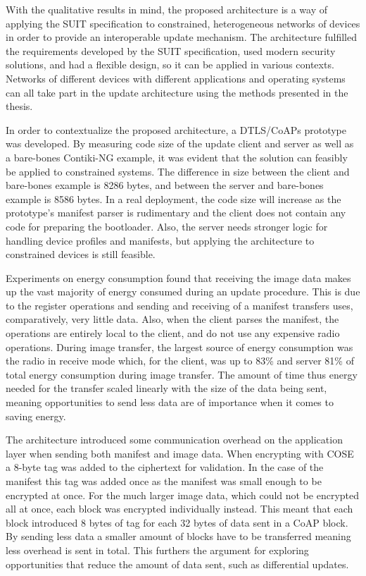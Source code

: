 \documentclass[0-thesis.tex]{subfiles}
\begin{document}
With the qualitative results in mind, the proposed architecture is a way of applying the
SUIT specification to constrained, heterogeneous networks of devices in order to provide
an interoperable update mechanism. The architecture fulfilled the requirements developed
by the SUIT specification, used modern security solutions, and had a flexible design, so
it can be applied in various contexts. Networks of different devices with different
applications and operating systems can all take part in the update architecture using the
methods presented in the thesis.

In order to contextualize the proposed architecture, a DTLS/CoAPs prototype was developed.
By measuring code size of the update client and server as well as a bare-bones Contiki-NG
example, it was evident that the solution can feasibly be applied to constrained systems.
The difference in size between the client and bare-bones example is 8286 bytes, and
between the server and bare-bones example is 8586 bytes. In a real deployment, the code
size will increase as the prototype's manifest parser is rudimentary and the client does
not contain any code for preparing the bootloader. Also, the server needs stronger logic
for handling device profiles and manifests, but applying the architecture to constrained
devices is still feasible.

Experiments on energy consumption found that receiving the image data makes up the vast
majority of energy consumed during an update procedure. This is due to the register
operations and sending and receiving of a manifest transfers uses, comparatively, very
little data. Also, when the client parses the manifest, the operations are entirely local
to the client, and do not use any expensive radio operations. During image transfer, the
largest source of energy consumption was the radio in receive mode which, for the client,
was up to 83\% and server 81\% of total energy consumption during image transfer. The
amount of time thus energy needed for the transfer scaled linearly with the size of the
data being sent, meaning opportunities to send less data are of importance when it comes
to saving energy.

The architecture introduced some communication overhead on the application layer when
sending both manifest and image data. When encrypting with COSE a 8-byte tag was added to
the ciphertext for validation. In the case of the manifest this tag was added once as the
manifest was small enough to be encrypted at once. For the much larger image data, which
could not be encrypted all at once, each block was encrypted individually instead. This
meant that each block introduced 8 bytes of tag for each 32 bytes of data sent in a CoAP
block. By sending less data a smaller amount of blocks have to be transferred meaning less
overhead is sent in total. This furthers the argument for exploring opportunities that
reduce the amount of data sent, such as differential updates.
\end{document}
